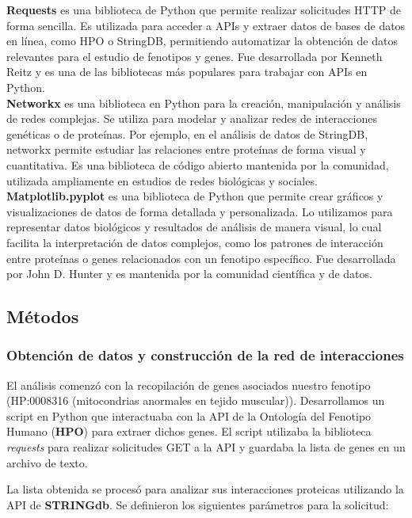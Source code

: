 \textbf{Requests} es una biblioteca de Python que permite realizar solicitudes HTTP de forma sencilla.
Es utilizada para acceder a APIs y extraer datos de bases de datos en línea, como HPO o StringDB, permitiendo automatizar la obtención de datos relevantes para el estudio de fenotipos y genes.
Fue desarrollada por Kenneth Reitz y es una de las bibliotecas más populares para trabajar con APIs en Python.\\


\textbf{Networkx} es una biblioteca en Python para la creación, manipulación y análisis de redes complejas.
Se utiliza para modelar y analizar redes de interacciones genéticas o de proteínas. Por ejemplo, en el análisis de datos de StringDB, networkx permite estudiar las relaciones entre proteínas de forma visual y cuantitativa.
Es una biblioteca de código abierto mantenida por la comunidad, utilizada ampliamente en estudios de redes biológicas y sociales.\\


\textbf{Matplotlib.pyplot} es una biblioteca de Python que permite crear gráficos y visualizaciones de datos de forma detallada y personalizada.
Lo utilizamos para representar datos biológicos y resultados de análisis de manera visual, lo cual facilita la interpretación de datos complejos, como los patrones de interacción entre proteínas o genes relacionados con un fenotipo específico.
Fue desarrollada por John D. Hunter y es mantenida por la comunidad científica y de datos.



\subsection{\textbf{Métodos}}


\subsubsection{\textbf{Obtención de datos y construcción de la red de interacciones}}

El análisis comenzó con la recopilación de genes asociados nuestro fenotipo (HP:0008316 (mitocondrias anormales en tejido muscular)). Desarrollamos un script en Python que interactuaba con la API de la Ontología del Fenotipo Humano (\textbf{HPO}) para extraer dichos genes. El script utilizaba la biblioteca \textit{requests} para realizar solicitudes GET a la API y guardaba la lista de genes en un archivo de texto.

La lista obtenida se procesó para analizar sus interacciones proteicas utilizando la API de \textbf{STRINGdb}. Se definieron los siguientes parámetros para la solicitud:

